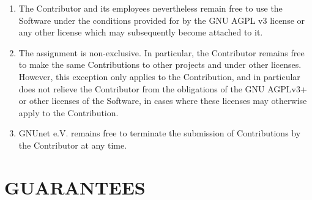 \documentclass[a4paper]{article} %
\newenvironment{enumpar}{%
  \renewcommand{\labelenumi}{\theenumi}%
  \renewcommand{\theenumi}{(\arabic{enumi})}%
  \renewcommand{\labelenumii}{\theenumii}%
  \renewcommand{\theenumii}{(\alph{enumii})}%
  \begin{enumerate}}
{\end{enumerate}}
\begin{document}
\begin{enumpar}
    promises to ensure that all participation by its employees in the
    development of the Software ceases.
  \item The Contributor and its employees nevertheless remain free to
    use the Software under the conditions provided for by the GNU AGPL
    v3 license or any other license which may subsequently become
    attached to it.
  \item The assignment is non-exclusive. In particular, the
    Contributor remains free to make the same Contributions to other
    projects and under other licenses.  However, this exception only
    applies to the Contribution, and in particular does not relieve
    the Contributor from the obligations of the GNU AGPLv3+ or other
    licenses of the Software, in cases where these licenses may
    otherwise apply to the Contribution.
  \item GNUnet e.V. remains free to terminate the submission of
    Contributions by the Contributor at any time.
\end{enumpar}

\section{GUARANTEES}
\end{document}
